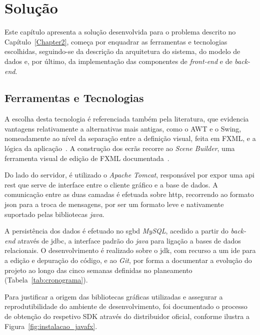 
\chapter{Solução} 	%
\label{Chapter3} 		%


\noindent Este capítulo apresenta a solução desenvolvida para o problema descrito no Capítulo~\ref{Chapter2}, começa por enquadrar as ferramentas e tecnologias escolhidas, seguindo-se da descrição da arquitetura do sistema, do modelo de dados e, por último, da implementação das componentes de \textit{front-end} e de \textit{back-end}.

\section{Ferramentas e Tecnologias}
\label{sec:Ch3.1}

\noindent A escolha desta tecnologia é referenciada também pela literatura, que evidencia vantagens relativamente a alternativas mais antigas, como o AWT e o Swing, nomeadamente ao nível da separação entre a definição visual, feita em FXML, e a lógica da aplicação~\cite{Pereira2020}. A construção dos ecrãs recorre ao \textit{Scene Builder}, uma ferramenta visual de edição de FXML  documentada~\cite{Vivien2010}.


\noindent Do lado do servidor, é utilizado o \textit{Apache Tomcat}, responsável por expor uma \ac{api} \ac{rest} que serve de interface entre o cliente gráfico e a base de dados. A comunicação entre as duas camadas é efetuada sobre \ac{http}, recorrendo ao formato \ac{json} para a troca de mensagens, por ser um formato leve e nativamente suportado pelas bibliotecas \textit{java}.

\noindent A persistência dos dados é efetuado no \ac{sgbd} \textit{MySQL}, acedido a partir do \textit{back-end} através de \ac{jdbc}, a interface padrão do \textit{java} para ligação a bases de dados relacionais. O desenvolvimento é realizado sobre o \ac{jdk}, com recurso a um \ac{ide} para a edição e depuração do código, e ao \textit{Git}, por forma a documentar a evolução do projeto ao longo das cinco semanas definidas no planeamento (Tabela~\ref{tab:cronograma}).

Para justificar a origem das bibliotecas gráficas utilizadas e assegurar a reprodutibilidade do ambiente de desenvolvimento, foi documentado o processo de obtenção do respetivo SDK através do distribuidor oficial, conforme ilustra a Figura~\ref{fig:instalacao_javafx}.

